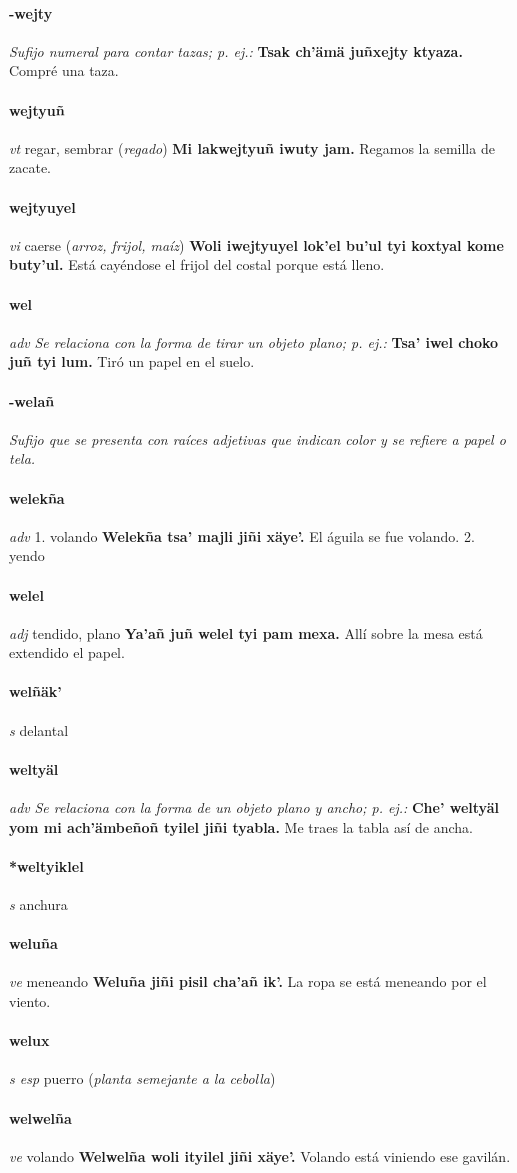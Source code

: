 \documentclass{scrbook}
\newcommand{\entry}[1]{\paragraph{#1}}
\newcommand{\onedefinition}[1]{#1.}
\newcommand{\nontranslationdef}[1]{\textit{#1}}
\newcommand{\partofspeech}[1]{\textit{#1}}
\newcommand{\spanishtranslation}[1]{#1}
\newcommand{\clarification}[1]{(\textit{#1})}
\newcommand{\cholexample}[1]{\textbf{#1}}
\newcommand{\exampletranslation}[1]{#1}
\begin{document}
\begin{multicols}{2}
\entry{-wejty}
\nontranslationdef{Sufijo numeral para contar tazas; p. ej.:}
\cholexample{Tsak ch'ämä juñxejty ktyaza.}
\exampletranslation{Compré una taza.}

\entry{wejtyuñ}
\partofspeech{vt}
\spanishtranslation{regar, sembrar}
\clarification{regado}
\cholexample{Mi lakwejtyuñ iwuty jam.}
\exampletranslation{Regamos la semilla de zacate.}

\entry{wejtyuyel}
\partofspeech{vi}
\spanishtranslation{caerse}
\clarification{arroz, frijol, maíz}
\cholexample{Woli iwejtyuyel lok'el bu'ul tyi koxtyal kome buty'ul.}
\exampletranslation{Está cayéndose el frijol del costal porque está lleno.}

\entry{wel}
\partofspeech{adv}
\nontranslationdef{Se relaciona con la forma de tirar un objeto plano; p. ej.:}
\cholexample{Tsa' iwel choko juñ tyi lum.}
\exampletranslation{Tiró un papel en el suelo.}

\entry{-welañ}
\nontranslationdef{Sufijo que se presenta con raíces adjetivas que indican color y se refiere a papel o tela.}

\entry{welekña}
\partofspeech{adv}
\onedefinition{1}
\spanishtranslation{volando}
\cholexample{Welekña tsa' majli jiñi xäye'.}
\exampletranslation{El águila se fue volando.}
\onedefinition{2}
\spanishtranslation{yendo}

\entry{welel}
\partofspeech{adj}
\spanishtranslation{tendido, plano}
\cholexample{Ya'añ juñ welel tyi pam mexa.}
\exampletranslation{Allí sobre la mesa está extendido el papel.}

\entry{welñäk'}
\partofspeech{s}
\spanishtranslation{delantal}

\entry{weltyäl}
\partofspeech{adv}
\nontranslationdef{Se relaciona con la forma de un objeto plano y ancho; p. ej.:}
\cholexample{Che' weltyäl yom mi ach'ämbeñoñ tyilel jiñi tyabla.}
\exampletranslation{Me traes la tabla así de ancha.}

\entry{*weltyiklel}
\partofspeech{s}
\spanishtranslation{anchura}

\entry{weluña}
\partofspeech{ve}
\spanishtranslation{meneando}
\cholexample{Weluña jiñi pisil cha'añ ik'.}
\exampletranslation{La ropa se está meneando por el viento.}

\entry{welux}
\partofspeech{s esp}
\spanishtranslation{puerro}
\clarification{planta semejante a la cebolla}

\entry{welwelña}
\partofspeech{ve}
\spanishtranslation{volando}
\cholexample{Welwelña woli ityilel jiñi xäye'.}
\exampletranslation{Volando está viniendo ese gavilán.}


\end{multicols}
\end{document}
